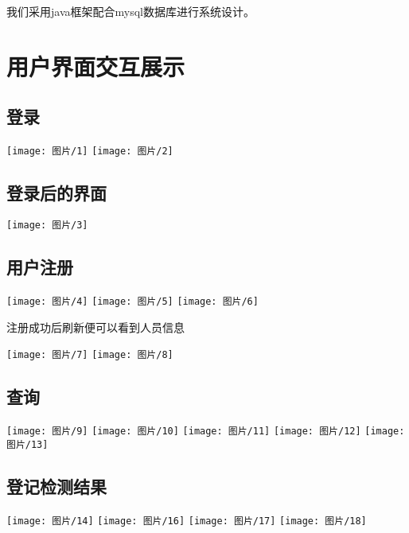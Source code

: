 \documentclass{article}
\begin{document}
我们采用java框架配合mysql数据库进行系统设计。

\section{用户界面交互展示}
\subsection{登录}
\begin{center}
\texttt{[image: 图片/1]}
\texttt{[image: 图片/2]}
\end{center}
\subsection{登录后的界面}
\begin{center}
\texttt{[image: 图片/3]}
\end{center}
\subsection{用户注册}
\begin{center}
\texttt{[image: 图片/4]}
\texttt{[image: 图片/5]}
\texttt{[image: 图片/6]}
\end{center}
注册成功后刷新便可以看到人员信息
\begin{center}
\texttt{[image: 图片/7]}
\texttt{[image: 图片/8]}
\end{center}
\subsection{查询}
\begin{center}
\texttt{[image: 图片/9]}
\texttt{[image: 图片/10]}
\texttt{[image: 图片/11]}
\texttt{[image: 图片/12]}
\texttt{[image: 图片/13]}
\end{center}
\subsection{登记检测结果}
\begin{center}
\texttt{[image: 图片/14]}
\texttt{[image: 图片/16]}
\texttt{[image: 图片/17]}
\texttt{[image: 图片/18]}
\end{center}
\end{document}

